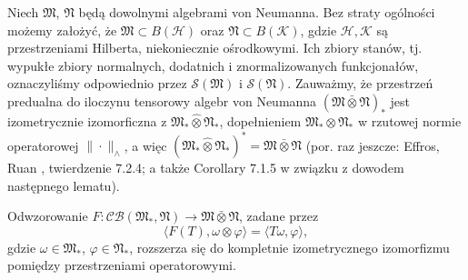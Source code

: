 Niech  $\mathfrak{M}$, $\mathfrak{N}$
będą dowolnymi algebrami von Neumanna.
Bez straty ogólności możemy założyć, że
$\mathfrak{M}\subset B(\mathcal{H})$ oraz $\mathfrak{N}\subset B(\mathcal{K})$,
gdzie  $\mathcal{H},\mathcal{K}$
są przestrzeniami Hilberta, niekoniecznie ośrodkowymi.
Ich zbiory stanów, tj. wypukłe zbiory normalnych, dodatnich i znormalizowanych
funkcjonałów, oznaczyliśmy odpowiednio przez
$\mathcal{S}(\mathfrak{M})$ i $\mathcal{S}(\mathfrak{N})$.
Zauważmy, że przestrzeń predualna do iloczynu tensorowy algebr von Neumanna
$(\mathfrak{M} \bar{\otimes} \mathfrak{N})_{*}$
jest izometrycznie izomorficzna z
$\mathfrak{M}_*\hat{\otimes}\mathfrak{N}_*$, dopełnieniem
$\mathfrak{M}_*\otimes\mathfrak{N}_*$ w rzutowej normie operatorowej
$\|\cdot\|_\wedge$,
a więc $(\mathfrak{M}_*\hat{\otimes}\mathfrak{N}_*)^*= \mathfrak{M} \bar{\otimes} \mathfrak{N}$
(por. raz jeszcze: Effros, Ruan \cite{Effros2000}, twierdzenie 7.2.4;
a także Corollary 7.1.5 w związku z dowodem następnego lematu).
\begin{Lemma}
\label{thm:isometry}
Odwzorowanie $F: \mathcal{CB}(\mathfrak{M}_{*}, \mathfrak{N})
\rightarrow \mathfrak{M} \bar{\otimes} \mathfrak{N}$,
zadane przez
\begin{equation}
\langle F(T), \omega \otimes \varphi \rangle =\langle T\omega, \varphi \rangle,
\end{equation}
gdzie $\omega \in \mathfrak{M}_{*}$, $\varphi \in \mathfrak{N}_{*}$,
rozszerza się do kompletnie izometrycznego izomorfizmu pomiędzy przestrzeniami
operatorowymi.
\end{Lemma}

